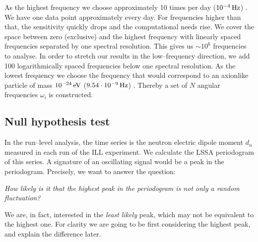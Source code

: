As the highest frequency we choose approximately 10 times per day ($\unit[10^{-4}]{Hz}$) . We have one data point approximately every day. For frequencies higher than that, the sensitivity quickly drops and the computational needs rise. We cover the space between zero (exclusive) and the highest frequency with linearly spaced frequencies separated by one spectral resolution. This gives us $\sim 10^6$ frequencies to analyse. In order to stretch our results in the low--frequency direction, we add 100 logarithmically spaced frequencies below one spectral resolution. As the lowest frequency we choose the frequency that would correspond to an axionlike particle of mass $\unit[10^{-24}]{eV}$ ($\unit[9.54 \cdot 10^ {-9}]{Hz}$) .  Thereby a set of $N$ angular frequencies $\omega_i$ is constructed.


\subsection{Null hypothesis test}
In the run--level analysis, the time series is the neutron electric dipole moment $d_n$ measured in each run of the ILL experiment. We calculate the LSSA periodogram of this series. A signature of an oscillating signal would be a peak in the periodogram. Precisely, we want to answer the question:

\begin{center}
  \emph{How likely is it that the highest peak in the periodogram is not only a random fluctuation?}
\end{center}

We are, in fact, interested in the \emph{least likely} peak, which may not be equivalent to the highest one. For clarity we are going to be first considering the highest peak, and explain the difference later.

